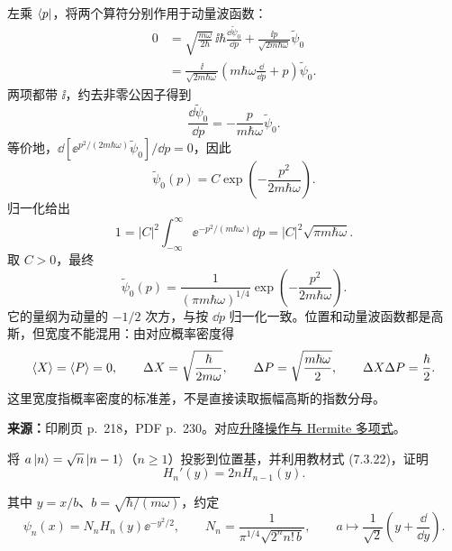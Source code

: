 \begin{checkedsolution}
左乘 $\left\langle p\right|$，将两个算符分别作用于动量波函数：
\begin{align}
  0&=\sqrt{\frac{m\omega}{2\hbar}}\,\ii\hbar
        \frac{\dd\widetilde\psi_0}{\dd p}
     +\frac{\ii p}{\sqrt{2m\hbar\omega}}\widetilde\psi_0\\
   &=\frac{\ii}{\sqrt{2m\hbar\omega}}
      \left(m\hbar\omega\frac{\dd}{\dd p}+p\right)\widetilde\psi_0.
\end{align}
两项都带 $\ii$，约去非零公因子得到
\begin{equation}
  \boxed{\frac{\dd\widetilde\psi_0}{\dd p}
       =-\frac{p}{m\hbar\omega}\widetilde\psi_0}.
\end{equation}
等价地，$\dd[\ee^{p^2/(2m\hbar\omega)}\widetilde\psi_0]/\dd p=0$，因此
\begin{equation}
  \widetilde\psi_0(p)=C\exp\left(-\frac{p^2}{2m\hbar\omega}\right).
\end{equation}
归一化给出
\begin{equation}
  1=|C|^2\int_{-\infty}^{\infty}\ee^{-p^2/(m\hbar\omega)}\dd p
   =|C|^2\sqrt{\pi m\hbar\omega}.
\end{equation}
取 $C>0$，最终
\begin{equation}
  \boxed{\widetilde\psi_0(p)=\frac1{(\pi m\hbar\omega)^{1/4}}
           \exp\left(-\frac{p^2}{2m\hbar\omega}\right)}.
\end{equation}
它的量纲为动量的 $-1/2$ 次方，与按 $\dd p$ 归一化一致。位置和动量波函数都是高斯，但宽度不能混用：由对应概率密度得
\begin{equation}
  \left\langle X \right\rangle=\left\langle P \right\rangle=0,\qquad
  \Delta X=\sqrt{\frac{\hbar}{2m\omega}},\qquad
  \Delta P=\sqrt{\frac{m\hbar\omega}{2}},\qquad
  \Delta X\Delta P=\frac\hbar2.
\end{equation}
这里宽度指概率密度的标准差，不是直接读取振幅高斯的指数分母。
\end{checkedsolution}

\noindent\begin{minipage}{\linewidth}
\textbf{来源：}印刷页 p.~218，PDF p.~230。对应\hyperref[topic:QM-C07-S05-T02]{升降操作与 Hermite 多项式}。

将 $a\left|n\right\rangle=\sqrt n\left|n-1\right\rangle$（$n\ge1$）投影到位置基，并利用教材式 (7.3.22)，证明
\begin{equation}
  H_n'(y)=2nH_{n-1}(y).
\end{equation}
\end{minipage}
其中 $y=x/b$、$b=\sqrt{\hbar/(m\omega)}$，约定
\begin{equation}
  \psi_n(x)=N_nH_n(y)\ee^{-y^2/2},\qquad
  N_n=\frac1{\pi^{1/4}\sqrt{2^n n!\,b}},\qquad
  a\mapsto\frac1{\sqrt2}\left(y+\frac{\dd}{\dd y}\right).
\end{equation}

